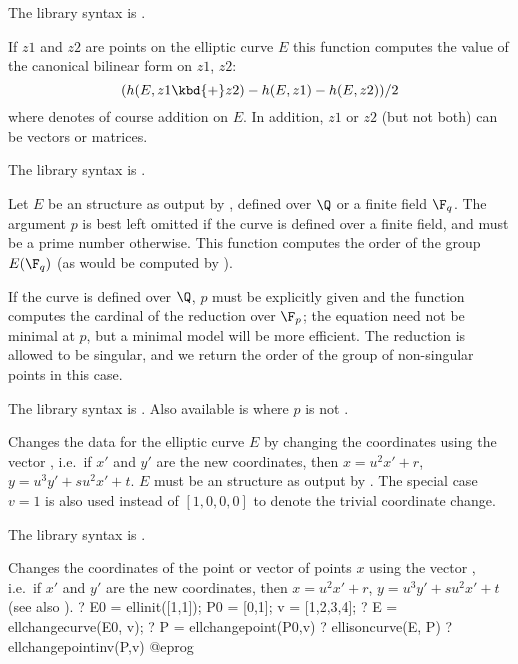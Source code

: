 The library syntax is .

\label{se:ellbil}
If $z1$ and $z2$ are points on the elliptic
curve $E$ this function
computes the value of the canonical bilinear form on $z1$, $z2$:
$$ ( h(E,z1\kbd{+}z2) - h(E,z1) - h(E,z2) ) / 2 $$
where \kbd{+} denotes of course addition on $E$. In addition, $z1$ or $z2$
(but not both) can be vectors or matrices.

The library syntax is .

\label{se:ellcard}
Let $E$ be an  structure as output by , defined over
$\Q$ or a finite field $\F_q$. The argument $p$ is best left omitted if the
curve is defined over a finite field, and must be a prime number otherwise.
This function computes the order of the group $E(\F_q)$ (as would be
computed by ).

If the curve is defined over $\Q$, $p$ must be explicitly given and the
function computes the cardinal of the reduction over $\F_p$; the
equation need not be minimal at $p$, but a minimal model will be more
efficient. The reduction is allowed to be singular, and we return the order
of the group of non-singular points in this case.

The library syntax is .
Also available is  where $p$ is not
.

\label{se:ellchangecurve}
Changes the data for the elliptic curve $E$
by changing the coordinates using the vector , i.e.~if $x'$
and $y'$ are the new coordinates, then $x=u^2x'+r$, $y=u^3y'+su^2x'+t$.
$E$ must be an  structure as output by . The special
case $v = 1$ is also used instead of $[1,0,0,0]$ to denote the
trivial coordinate change.

The library syntax is .

\label{se:ellchangepoint}
Changes the coordinates of the point or
vector of points $x$ using the vector , i.e.~if $x'$ and
$y'$ are the new coordinates, then $x=u^2x'+r$, $y=u^3y'+su^2x'+t$ (see also
).
\bprog
? E0 = ellinit([1,1]); P0 = [0,1]; v = [1,2,3,4];
? E = ellchangecurve(E0, v);
? P = ellchangepoint(P0,v)
? ellisoncurve(E, P)
? ellchangepointinv(P,v)
@eprog

